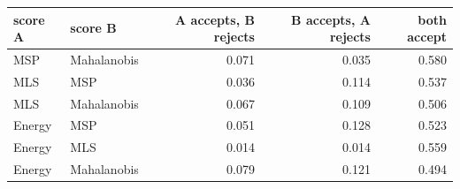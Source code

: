 \begin{tabular}{llrrr}
\toprule
score A & score B & A accepts, B rejects & B accepts, A rejects & both accept \\
\midrule
MSP & Mahalanobis & 0.071 & 0.035 & 0.580 \\
MLS & MSP & 0.036 & 0.114 & 0.537 \\
MLS & Mahalanobis & 0.067 & 0.109 & 0.506 \\
Energy & MSP & 0.051 & 0.128 & 0.523 \\
Energy & MLS & 0.014 & 0.014 & 0.559 \\
Energy & Mahalanobis & 0.079 & 0.121 & 0.494 \\
\bottomrule
\end{tabular}
